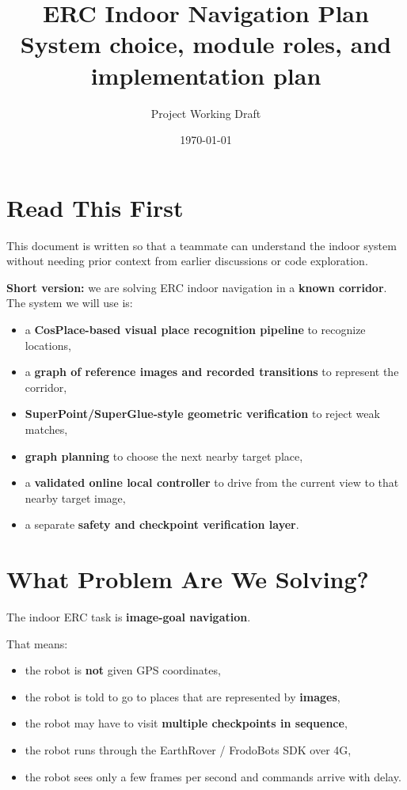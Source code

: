 \documentclass[11pt,a4paper]{article}
\title{ERC Indoor Navigation Plan\\[0.3em]
\large System choice, module roles, and implementation plan}
\author{Project Working Draft}
\date{\today}
\begin{document}
\maketitle

\section{Read This First}

This document is written so that a teammate can understand the indoor system
without needing prior context from earlier discussions or code exploration.

\begin{mdframed}
\textbf{Short version:} we are solving ERC indoor navigation in a \textbf{known
corridor}. The system we will use is:

\begin{itemize}[nosep]
  \item a \textbf{CosPlace-based visual place recognition pipeline} to recognize locations,
  \item a \textbf{graph of reference images and recorded transitions} to represent the corridor,
  \item \textbf{SuperPoint/SuperGlue-style geometric verification} to reject weak matches,
  \item \textbf{graph planning} to choose the next nearby target place,
  \item a \textbf{validated online local controller} to drive from the current view to that nearby target image,
  \item a separate \textbf{safety and checkpoint verification layer}.
\end{itemize}
\end{mdframed}


\section{What Problem Are We Solving?}

The indoor ERC task is \textbf{image-goal navigation}.

That means:

\begin{itemize}[nosep]
  \item the robot is \textbf{not} given GPS coordinates,
  \item the robot is told to go to places that are represented by \textbf{images},
  \item the robot may have to visit \textbf{multiple checkpoints in sequence},
  \item the robot runs through the EarthRover / FrodoBots SDK over 4G,
  \item the robot sees only a few frames per second and commands arrive with delay.
\end{itemize}
\end{document}
